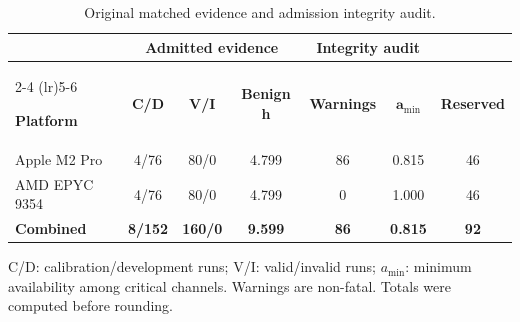 \begin{table}[!t]
\centering
\caption{Original matched evidence and admission integrity audit.}
\label{tab:development_data_quality}

{\scriptsize
\setlength{\tabcolsep}{2.3pt}
\renewcommand{\arraystretch}{1.02}

\begin{tabular}{@{}lcccccc@{}}
\toprule
&
\multicolumn{3}{c}{\textbf{Admitted evidence}} &
\multicolumn{2}{c}{\textbf{Integrity audit}} &
\\
\cmidrule(lr){2-4}
\cmidrule(lr){5-6}

\textbf{Platform} &
\textbf{C/D} &
\textbf{V/I} &
\textbf{Benign h} &
\textbf{Warnings} &
$\boldsymbol{a}_{\min}$ &
\textbf{Reserved} \\
\midrule

Apple M2 Pro
    & 4/76 & 80/0 & 4.799 & 86 & 0.815 & 46 \\

AMD EPYC 9354
    & 4/76 & 80/0 & 4.799 & 0 & 1.000 & 46 \\

\midrule
\textbf{Combined}
    & \textbf{8/152}
    & \textbf{160/0}
    & \textbf{9.599}
    & \textbf{86}
    & \textbf{0.815}
    & \textbf{92} \\
\bottomrule
\end{tabular}
}

\vspace{2pt}
\begin{minipage}{\columnwidth}
\scriptsize
\raggedright
C/D: calibration/development runs;
V/I: valid/invalid runs;
$a_{\min}$: minimum availability among critical channels. Warnings are non-fatal. Totals were computed before rounding.
\end{minipage}
\end{table}
